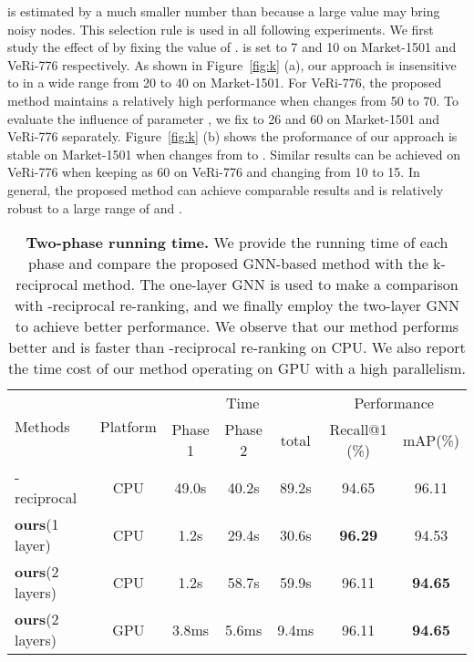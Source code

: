 \documentclass[10pt,twocolumn,letterpaper]{article}
\begin{document}
 is estimated by a much smaller number than  because a large value may bring noisy nodes. This selection rule is used in all following experiments. We first study the effect of  by fixing the value of . 
 is set to 7 and 10 on Market-1501 and VeRi-776 respectively.
As shown in Figure~\ref{fig:k} (a), our approach is insensitive to  in a wide range from 20 to 40 on Market-1501. For VeRi-776, the proposed method maintains a relatively high performance when  changes from 50 to 70.
To evaluate the influence of  parameter , we fix  to 26 and 60 on Market-1501 and VeRi-776 separately.
Figure~\ref{fig:k} (b) shows the proformance of our approach is stable on Market-1501 when  changes from  to .
Similar results can be achieved on VeRi-776 when keeping  as 60 on VeRi-776 and changing  from 10 to 15.
In general, the proposed method can achieve comparable results and is relatively robust to a large range of  and .


\setlength{\tabcolsep}{3pt}
\begin{table}[]
\scriptsize
\begin{center}
\begin{tabular}{l|c|ccc|cc}
\toprule[1pt]
\multirow{2}{*}{Methods}& \multirow{2}{*}{Platform} & \multicolumn{3}{c|}{Time} & \multicolumn{2}{c}{Performance}\\ 
&  & Phase 1    & Phase 2  &total & Recall@1 (\%) & mAP(\%)\\ \midrule[0.5pt]
-reciprocal~\cite{zhong2017re} & CPU    &49.0s &40.2s   &89.2s  &94.65&96.11\\
\textbf{ours}(1 layer) & CPU   &1.2s   &29.4s  &30.6s & \textbf{96.29} & 94.53\\
\textbf{ours}(2 layers) & CPU   &1.2s   &58.7s  &59.9s&96.11&\textbf{94.65} \\
\textbf{ours}(2 layers) & GPU   &3.8ms   &5.6ms  &9.4ms &96.11&\textbf{94.65}\\
\bottomrule[1pt]
\end{tabular}
\end{center}
\caption{\textbf{Two-phase running time.} We provide the running time of each phase and compare the proposed GNN-based method with the k-reciprocal method. The one-layer GNN is used to make a comparison with -reciprocal re-ranking, and we finally employ the two-layer GNN to achieve better performance.
We observe that our method performs better and is faster than -reciprocal re-ranking on CPU.  We also report the time cost of our method operating on GPU with a high parallelism.  } 
\label{table:ablation_time}
\end{table}
\end{document}
